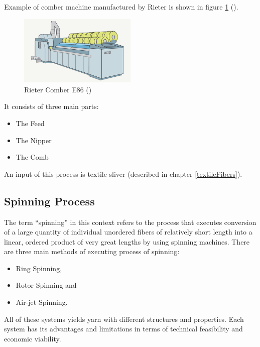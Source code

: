 \documentclass[twoside]{ctuthesis}
\theoremstyle{plain}
\theoremstyle{definition}
\theoremstyle{note}
\begin{document}
Example of comber machine manufactured by Rieter is shown in figure \ref{fig:rieterComber} (\cite{cite:RIKIpedia_combing}).
\begin{figure}[h]
	\centering
	\includegraphics[width=0.5\textwidth]{Rieter_comber.jpg}
	\caption{Rieter Comber E86 (\cite{cite:RIKIpedia_combing})}
	\label{fig:rieterComber}
\end{figure}

It consists of three main parts: 
\begin{itemize}
	\setlength{\itemsep}{5pt}
\item The Feed

\item The Nipper

\item The Comb
\end{itemize}
An input of this process is textile sliver (described in chapter \ref{textileFibers}).
\subsection{Spinning Process}
\label{spinningProcesses}
The term “spinning” in this context refers to the process that executes conversion of a large quantity of individual unordered fibers of relatively short length into a linear, ordered product of very great lengths by using spinning machines. There are three main methods of executing process of spinning:
\begin{itemize}
	\setlength{\itemsep}{5pt}
\item Ring Spinning,

\item Rotor Spinning and

\item Air-jet Spinning.
\end{itemize}
All of these systems yields yarn with different structures and properties. Each system has its advantages and limitations in terms of technical feasibility and economic viability.
\end{document}
